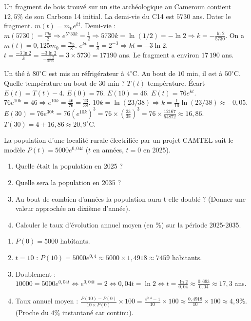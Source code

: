 \documentclass[11pt]{article}
\begin{document}
\begin{exoresolu}
Un fragment de bois trouvé sur un site archéologique au Cameroun contient $12,5\%$ de son Carbone 14 initial. La demi-vie du C14 est $5730$ ans. Dater le fragment.
\tcblower
$m(t) = m_0 e^{kt}$. Demi-vie : $m(5730) = \frac{m_0}{2} \Rightarrow e^{5730k} = \frac{1}{2} \Rightarrow 5730k = \ln(1/2) = -\ln 2 \Rightarrow k = -\frac{\ln 2}{5730}$.
On a $m(t) = 0,125 m_0 = \frac{m_0}{8}$.
$e^{kt} = \frac{1}{8} = 2^{-3} \Rightarrow kt = -3\ln 2$.
$t = \frac{-3\ln 2}{k} = \frac{-3\ln 2}{-\frac{\ln 2}{5730}} = 3 \times 5730 = 17190$ ans.
Le fragment a environ $17\,190$ ans.
\end{exoresolu}

\begin{exoresolu}
Un thé à $80^\circ\text{C}$ est mis au réfrigérateur à $4^\circ\text{C}$. Au bout de $10$ min, il est à $50^\circ\text{C}$. Quelle température au bout de $30$ min ?
\tcblower
$T(t)$ température. Écart $E(t) = T(t) - 4$. $E(0) = 76$. $E(10) = 46$.
$E(t) = 76 e^{kt}$. $76 e^{10k} = 46 \Rightarrow e^{10k} = \frac{46}{76} = \frac{23}{38}$.
$10k = \ln(23/38) \Rightarrow k = \frac{1}{10}\ln(23/38) \approx -0,05$.
$E(30) = 76 e^{30k} = 76 (e^{10k})^3 = 76 \times \left(\frac{23}{38}\right)^3 = 76 \times \frac{12167}{54872} \approx 16,86$.
$T(30) = 4 + 16,86 \approx 20,9^\circ\text{C}$.
\end{exoresolu}

\begin{exercice}
La population d'une localité rurale électrifiée par un projet CAMTEL suit le modèle $P(t) = 5000 e^{0,04 t}$ ($t$ en années, $t=0$ en 2025).
\begin{enumerate}
  \item Quelle était la population en 2025 ?
  \item Quelle sera la population en 2035 ?
  \item Au bout de combien d'années la population aura-t-elle doublé ? (Donner une valeur approchée au dixième d'année).
  \item Calculer le taux d'évolution annuel moyen (en $\%$) sur la période 2025-2035.
\end{enumerate}
\end{exercice}

\begin{corrige}
\begin{enumerate}
  \item $P(0) = 5000$ habitants.
  \item $t=10$ : $P(10) = 5000 e^{0,4} \approx 5000 \times 1,4918 \approx 7459$ habitants.
  \item Doublement : $10000 = 5000 e^{0,04 t} \iff e^{0,04 t} = 2 \iff 0,04 t = \ln 2 \iff t = \frac{\ln 2}{0,04} \approx \frac{0,693}{0,04} \approx 17,3$ ans.
  \item Taux annuel moyen : $\frac{P(10)-P(0)}{10 \times P(0)} \times 100 = \frac{e^{0,4}-1}{10} \times 100 \approx \frac{0,4918}{10} \times 100 \approx 4,9\%$. (Proche du $4\%$ instantané car continu).
\end{enumerate}
\end{corrige}
\end{document}
